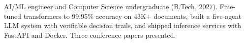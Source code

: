 
AI/ML engineer and Computer Science undergraduate (B.Tech, 2027). Fine-tuned transformers to 99.95\% accuracy on 43K+ documents, built a five-agent LLM system with verifiable decision trails, and shipped inference services with FastAPI and Docker. Three conference papers presented.
